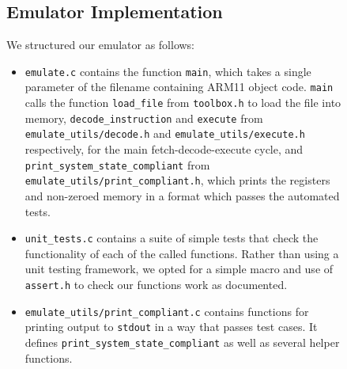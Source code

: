 \documentclass[10pt]{article}
\begin{document}
\begin{figure}[H]
\begin{minipage}{0.6\linewidth}

\subsection{Emulator Implementation}

We structured our emulator as follows:

\begin{itemize}
\item \texttt{emulate.c} contains the function \texttt{main}, which takes a single parameter of the filename containing ARM11 object code. \texttt{main} calls the function \texttt{load\_file} from \texttt{toolbox.h} to load the file into memory, \texttt{decode\_instruction} and \texttt{execute} from \texttt{emulate\_utils/decode.h} and \texttt{emulate\_utils/execute.h} respectively, for the main fetch-decode-execute cycle, and \texttt{print\_system\_state\_compliant} from \texttt{emulate\_utils/print\_compliant.h}, which prints the registers and non-zeroed memory in a format which passes the automated tests.
\item \texttt{unit\_tests.c} contains a suite of simple tests that check the functionality of each of the called functions. Rather than using a unit testing framework, we opted for a simple macro and use of \texttt{assert.h} to check our functions work as documented.
\item \texttt{emulate\_utils/print\_compliant.c} contains functions for printing output to \texttt{stdout} in a way that passes test cases. It defines \texttt{print\_system\_state\_compliant} as well as several helper functions.
\end{itemize}

\end{minipage}
\hspace{0.05\linewidth}
\begin{minipage}{0.35\linewidth}


\end{minipage}
\end{figure}
\end{document}
